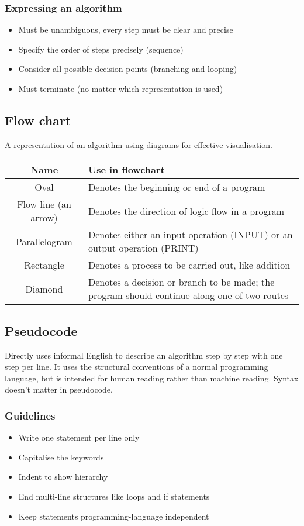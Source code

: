 \documentclass[11pt]{article}
\begin{document}
\subsubsection{Expressing an algorithm}
\label{sec:org18477c5}
\begin{itemize}
\item Must be unambiguous, every step must be clear and precise
\item Specify the order of steps precisely (sequence)
\item Consider all possible decision points (branching and looping)
\item Must terminate (no matter which representation is used)
\end{itemize}

 \newpage
\subsection{Flow chart}
\label{sec:org9da5a74}
A representation of an algorithm using diagrams for effective visualisation.

\begin{center}
\begin{tabular}{|c|m{22em}|}
\hline
\textbf{Name} & \textbf{Use in flowchart}\\
\hline
Oval & Denotes the beginning or end of a program\\
\hline
Flow line (an arrow) & Denotes the direction of logic flow in a program\\
\hline
Parallelogram & Denotes either an input operation (INPUT) or an output operation (PRINT)\\
\hline
Rectangle & Denotes a process to be carried out, like addition\\
\hline
Diamond & Denotes a decision or branch to be made; the program should continue along one of two routes\\
\hline
\end{tabular}
\end{center}
\subsection{Pseudocode}
\label{sec:orgfb5f590}
Directly uses informal English to describe an algorithm step by step with one step per line. It uses the structural conventions of a normal programming language, but is intended for human reading rather than machine reading. Syntax doesn't matter in pseudocode.
\subsubsection{Guidelines}
\label{sec:org7232aad}
\begin{itemize}
\item Write one statement per line only
\item Capitalise the keywords
\item Indent to show hierarchy
\item End multi-line structures like loops and if statements
\item Keep statements programming-language independent
\end{itemize}
\end{document}
